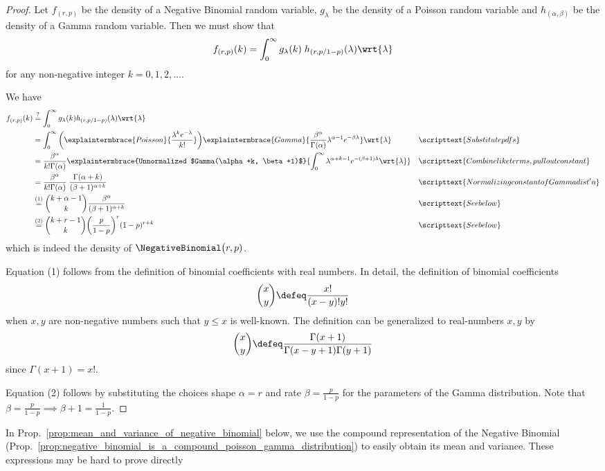 \documentclass{article} %
\newcommand{\carrierDensity}{h}
\begin{document}
\begin{proof}
Let $f_{(r,p)}$ be the density of a Negative Binomial random variable, $g_\lambda$ be the density of a Poisson random variable and $\carrierDensity_{(\alpha, \beta)}$ be the density of a Gamma random variable.   Then we must show that 
\[ f_{(r,p)}(k) = \int_0^\infty g_\lambda(k) \; h_{(r, p/1-p)}(\lambda) \wrt{\lambda} \]
for any non-negative integer $k=0,1,2,\hdots$.

We have
\begin{align*}
f_{(r,p)}(k) &\stackrel{?}{=} \int_0^\infty g_\lambda(k) h_{(r, p/1-p)}(\lambda) \wrt{\lambda}	&& \\
&=\int_0^\infty  \bigg( \explaintermbrace{Poisson}{\frac{\lambda^k e^{-\lambda}}{k!}} \bigg)   \explaintermbrace{Gamma}{\frac{\beta^\alpha}{\Gamma(\alpha)} \lambda^{\alpha-1} e^{-\beta \lambda}} \wrt{\lambda}	&& \scripttext{Substitute pdfs}\\
&= \frac{\beta^\alpha}{k! \Gamma(\alpha)} \explaintermbrace{Unnormalized $Gamma(\alpha+k, \beta+1)$}{\int_0^\infty \lambda^{\alpha+k-1} e^{-(\beta+1) \lambda} \wrt{\lambda}} && \scripttext{Combine like terms, pull out constant} \\
&= \frac{\beta^\alpha}{k! \Gamma(\alpha)}  \;  \frac{\Gamma(\alpha+k)}{(\beta+1)^{\alpha+k}} && \scripttext{Normalizing constant of Gamma dist'n} \\
&\stackrel{(1)}{=} \binom{k+\alpha-1}{k} \frac{\beta^\alpha}{(\beta+1)^{\alpha+k}} && \scripttext{See below} \\
&\stackrel{(2)}{=} \binom{k+r-1}{k} \bigg(\frac{p}{1-p} \bigg)^r (1-p)^{r+k} && \scripttext{See below} 
\end{align*}
%
which is indeed the density of $\NegativeBinomial\big(r, p)$. 

Equation (1) follows from the definition of binomial coefficients with real numbers.  In detail, the definition of binomial coefficients 
\[\binom{x}{y} \defeq \frac{x!}{(x-y)!y!}\]
 when $x,y$ are non-negative numbers such that $y \leq x$ is well-known. The definition can be generalized to real-numbers $x,y$ by 
 \[\binom{x}{y} \defeq \frac{\Gamma(x+1)}{\Gamma(x-y+1) \Gamma(y+1)}\]
 since $\Gamma(x+1)=x!$.
 
 Equation (2) follows by substituting the choices shape $\alpha=r$ and  rate $\beta=\frac{p}{1-p}$ for the parameters of the Gamma distribution.  Note that $ \beta=\frac{p}{1-p} \implies \beta+1 = \frac{1}{1-p}$.   
\end{proof}
%
In Prop.~\ref{prop:mean_and_variance_of_negative_binomial} below, we use the compound representation of the Negative Binomial (Prop.~\ref{prop:negative_binomial_is_a_compound_poisson_gamma_distribution}) to easily obtain its mean and variance. These expressions may be hard to prove directly 
 
\end{document}
